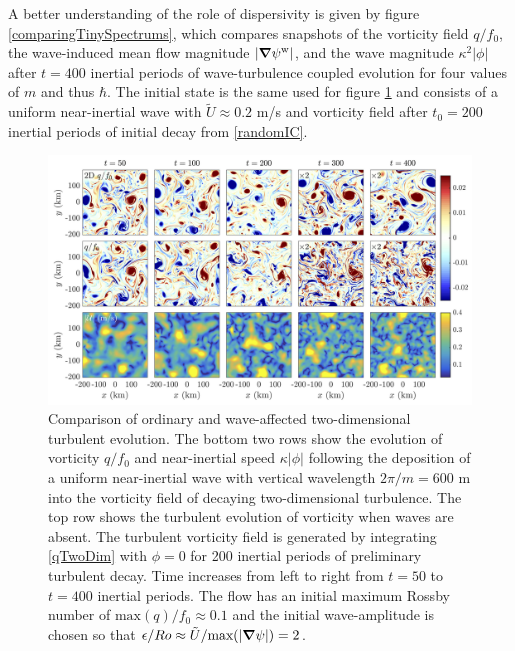 \documentclass[12pt, oneside]{book}
\begin{document}
\begin{subappendices}
A better understanding of the role of dispersivity is given by figure \ref{comparingTinySpectrums}, which compares snapshots of the vorticity field $q / f_0$, the wave-induced mean flow magnitude $| \boldsymbol \nabla \psi^{\mathrm{w}} |$, and the wave magnitude $\kappa^2 | \phi |$ after $t=400$ inertial periods of wave-turbulence coupled evolution for four values of $m$ and thus $\hbar$.  The initial state is the same used for figure \ref{initialFeelEarly} and consists of a uniform near-inertial wave with $\tilde U \approx 0.2$ m/s and vorticity field after $t_0 = 200$ inertial periods of initial decay from \eqref{randomIC}.  

\begin{figure}
\centering
\includegraphics[width = 1\textwidth]{stimulatedEarlyEvolution}
\caption[Comparison of ordinary and wave-affected two-dimensional turbulent evolution]{Comparison of ordinary and wave-affected two-dimensional turbulent evolution.  The bottom two rows show the evolution of vorticity $q/f_0$ and near-inertial speed $\kappa | \phi |$ following the deposition of a uniform near-inertial wave with vertical wavelength $2 \pi / m = 600$ m into the vorticity field of decaying two-dimensional turbulence.  The top row shows the turbulent evolution of vorticity when waves are absent.  The turbulent vorticity field is generated by integrating \eqref{qTwoDim} with $\phi = 0$ for 200 inertial periods of preliminary turbulent decay.  Time increases from left to right from $t=50$ to $t=400$ inertial periods.  The flow has an initial maximum Rossby number of $\text{max}(q)/f_0 \approx 0.1$ and the initial wave-amplitude is chosen so that $\epsilon / Ro \approx \tilde U / \text{max}(| \boldsymbol \nabla \psi |) = 2$.}
\label{initialFeelEarly}
\end{figure}


\end{subappendices}
\end{document}
